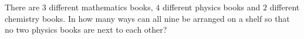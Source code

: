 There are $3$ different mathematics books, $4$ different physics books and $2$ different chemistry books. In how many ways can all nine be arranged on a shelf so that no two physics books are next to each other?
